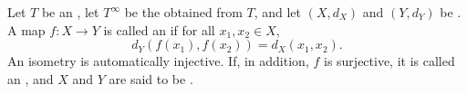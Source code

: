 \begin{definition} \label{definition:isometry_between_extended_metric_spaces_valued_in_ordered_commutative_monoid_with_adjoined_infinity}
Let $T$ be an , let $T^\infty$ be the  obtained from $T$, and let $(X, d_X)$ and $(Y, d_Y)$ be . A map $f : X \to Y$ is called an  if for all $x_1, x_2 \in X$,
\[
d_Y( f(x_1), f(x_2) ) = d_X( x_1, x_2 ).
\]
An isometry is automatically injective. If, in addition, $f$ is surjective, it is called an , and $X$ and $Y$ are said to be .
\end{definition}